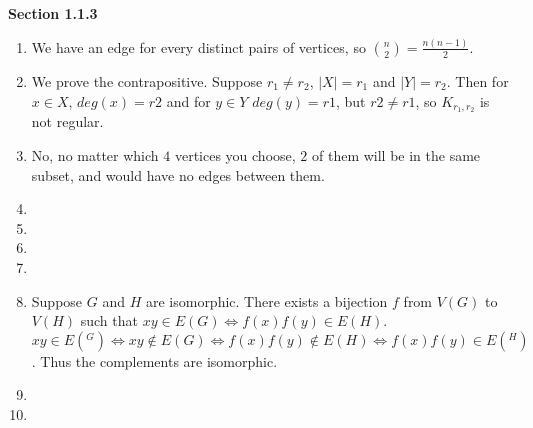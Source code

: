 \documentclass[11pt]{article}
\begin{document}
{\bfseries Section 1.1.3}

\begin{enumerate}[1]
    \item %
        We have an edge for every distinct pairs of vertices, so
        $\binom{n}{2} = \frac{n(n-1)}{2}$.
    \item %
        We prove the contrapositive. Suppose $r_1 \neq r_2$, $|X| = r_1$ and 
        $|Y| = r_2$. Then for $x \in X$, $deg(x) = r2$ and for $y \in Y$ 
        $deg(y) = r1$, but $r2 \neq r1$, so $K_{r_1, r_2}$ is not regular.
    \item %
        No, no matter which $4$ vertices you choose, $2$ of them will be in the 
        same subset, and would have no edges between them. 
    \item %
    \item %

    \item %

    \item %

    \item %
        Suppose $G$ and $H$ are isomorphic. There exists a bijection $f$ from 
        $V(G)$ to $V(H)$ such that $xy \in E(G) \iff f(x)f(y) \in E(H)$. 
        $$xy \in E(^G) \iff xy \notin E(G) \iff f(x)f(y) \notin E(H) \iff
        f(x)f(y) \in E(^H)$$. Thus the complements are isomorphic.

    \item %
        
    \item %
\end{enumerate}
\end{document}
